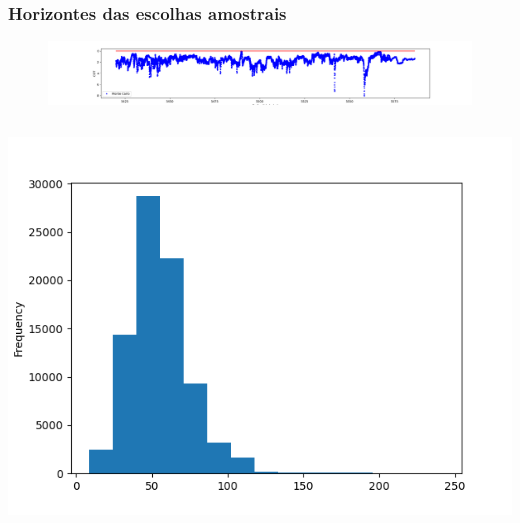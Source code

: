 \documentclass[aspectratio=169]{beamer} %
\begin{document}
{{\begin{frame}
\end{frame} 
}


{
\begin{frame}
	\frametitle{Horizontes das escolhas amostrais}

	\begin{figure}
		\flushright
		\includegraphics[scale=0.25]{images/1BRSA1007RJS.png}
	\end{figure}
	
		\begin{columns}[c] %
			\centering
			\includegraphics[scale=0.3]{images/GR_1BRSA1007RJS.png} %
		

\end{columns}
\end{frame}}}
\end{document}
